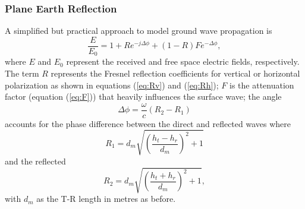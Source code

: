 \documentclass[10pt,journal,twoside]{IEEEtran}
\begin{document}
\subsubsection{Plane Earth Reflection}
A simplified but practical approach to model ground wave propagation is  \cite{Norton37,Angelakos} %
\begin{equation}
\label{eq:ground_wave_set}
\dfrac{E}{E_0} = 1 + Re^{-j\Delta\phi} + \left( 1 - R \right)Fe^{-\Delta\phi},
\end{equation}
where $E$ and $E_0$ represent the received and free space electric fields, respectively. The term $R$ represents the Fresnel reflection coefficients for vertical or horizontal polarization as shown in equations (\ref{eq:Rv}) and (\ref{eq:Rh}); $F$ is the attenuation factor (equation (\ref{eq:F})) that heavily influences the surface wave; the angle
\begin{equation}
\Delta\phi = \dfrac{\omega}{c} \left(R_2 - R_1\right)
\end{equation}
accounts for the phase difference between the direct and reflected waves where
\[ R_1 = d_m \sqrt{\left(\dfrac{h_t - h_r}{d_m} \right)^2 + 1} \]
and the reflected  
\[ R_2 = d_m \sqrt{\left(\dfrac{h_t + h_r}{d_m} \right)^2 + 1}, \]
with $d_m$ as the T-R length in metres as before.
\end{document}
